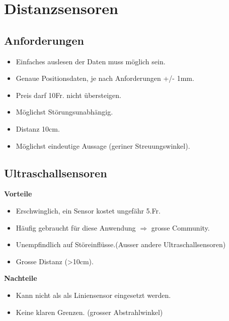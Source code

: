 \section*{Distanzsensoren}
\subsection{Anforderungen}
\begin{itemize}
\item Einfaches auslesen der Daten muss möglich sein.
\item Genaue Positionsdaten, je nach Anforderungen +/- 1mm.
\item Preis darf 10Fr. nicht übersteigen.
\item Möglichst Störungsunabhängig.
\item Distanz 10cm.
\item Möglichst eindeutige Aussage (geriner Streuungswinkel).
\end{itemize}

\subsection{Ultraschallsensoren}
\textbf {Vorteile}
\begin{itemize}
\item Erschwinglich, ein Sensor kostet ungefähr 5.Fr.
\item Häufig gebraucht für diese Anwendung $\Rightarrow$ grosse Community.
\item Unempfindlich auf Störeinflüsse.(Ausser andere Ultraschallsensoren)
\item Grosse Distanz (>10cm).\\
\end{itemize}
\textbf {Nachteile}
\begin{itemize}
\item Kann nicht als als Liniensensor eingesetzt werden.
\item Keine klaren Grenzen. (grosser Abstrahlwinkel)
\end{itemize}

